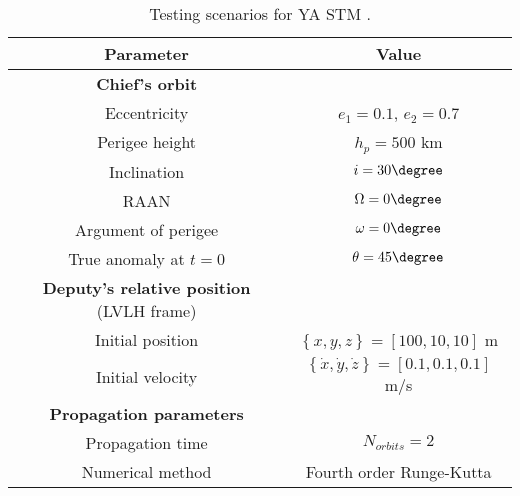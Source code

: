 \begin{table}[!htb]
\begin{center}
\begin{tabular}{|c|c|}
\hline 
\hline
\rowcolor{Gray!30}
\textbf{Parameter} & \textbf{Value} \\
\hline 
\hline 
\rowcolor{GMVred!20} \textbf{Chief's orbit} &   \\
\hline
 Eccentricity & $e_1 = 0.1$, $e_2 = 0.7$ \\  
 Perigee height & $h_p = 500$ km \\ 
 Inclination & $i = 30\degree$ \\ 
 RAAN & $\Omega = 0\degree$ \\ 
 Argument of perigee & $\omega = 0\degree$ \\ 
 True anomaly at $t = 0$ & $\theta = 45\degree$ \\  
\hline 
\rowcolor{GMVred!20}\textbf{Deputy's relative position} (LVLH frame) &   \\ 
\hline 
 Initial position & $\left\{ x, y, z\right\} = [100, 10, 10]$ m \\
 Initial velocity & $\left\{  \dot{x}, \dot{y}, \dot{z}\right\} = [0.1, 0.1, 0.1]$ m/s \\  
\hline 
\rowcolor{GMVred!20}\textbf{Propagation parameters} &  \\ 
\hline 
 Propagation time & $N_{orbits} = 2$ \\
 Numerical method & Fourth order Runge-Kutta \\
\hline 
\end{tabular} 
\end{center}
\label{tabCh3:Scenarios_YA}
\caption{Testing scenarios for YA STM \cite{Yamanaka_ankersen}.}
\end{table}
%
\FloatBarrier
%
